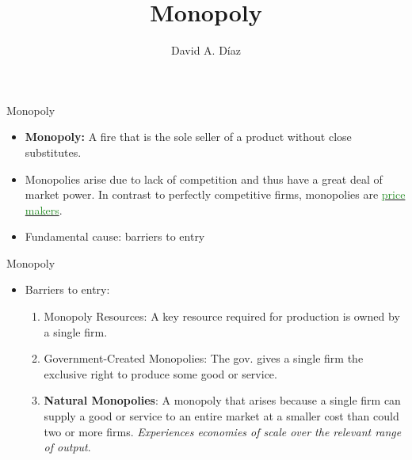 \documentclass[xcolor={dvipsnames},pdf, hyperref={colorlinks=true, citecolor=ForestGreen, linkcolor=BlueViolet, urlcolor=Magenta}]{beamer}
\title{Monopoly}
\author{David A. D\'iaz}
\institute{UNC Chapel Hill}
\date{}
\newcommand{\defn}[1]{\textbf{#1}}
\newcommand{\dd}[1]{{\underline{\textcolor{ForestGreen}{#1}}}}
\begin{document}
 
	
	\begin{frame}
		
		\titlepage
		
	\end{frame}



\begin{frame}{Monopoly}
\begin{itemize}
	\item \defn{Monopoly:} A fire that is the sole seller of a product without close substitutes.
	\item 	Monopolies arise due to lack of competition and thus have a great deal of market power. In contrast to perfectly competitive firms, monopolies are \dd{price makers}.
	\item Fundamental cause: barriers to entry
\end{itemize}
\end{frame}

\begin{frame}{Monopoly}
	\begin{itemize}
		\item Barriers to entry:
			\begin{enumerate}
			\item Monopoly Resources: A key resource required for production is owned by a single firm.
			\item Government-Created Monopolies: The gov. gives a single firm the exclusive right to produce some good or service.
			\item \defn{Natural Monopolies}: A monopoly that arises because a single firm can supply a good or service to an entire market at a smaller cost than could two or more firms. \textit{Experiences economies of scale over the relevant range of output}.
			\end{enumerate}
	\end{itemize}

\end{frame}
\end{document}
